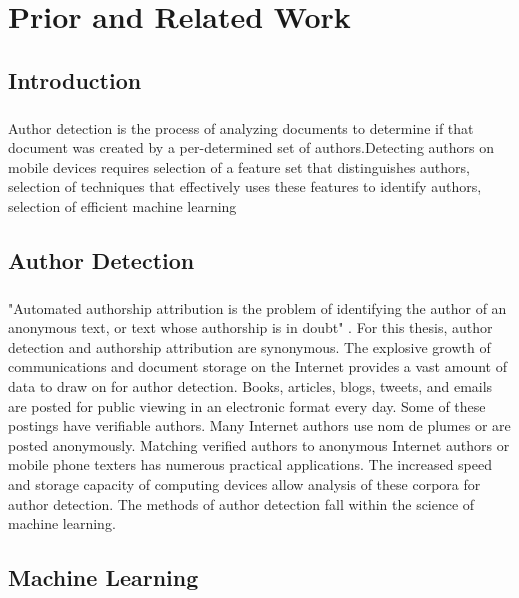 \chapter {Prior and Related Work}

\section {Introduction}
	\paragraph{}Author detection is the process of analyzing documents to determine if that document was created by a per-determined set of authors.Detecting authors on mobile devices requires selection of a feature set that distinguishes authors, selection of techniques that effectively uses these features to identify authors, selection of efficient machine learning

\section {Author Detection}
	\paragraph{}"Automated authorship attribution is the problem of identifying the author of an anonymous text, or text whose authorship is in doubt" \cite{love_attributing_2002}.  For this thesis, author detection and authorship attribution are synonymous.  The explosive growth of communications and document storage on the Internet provides a vast amount of data to draw on for author detection.  Books, articles, blogs, tweets, and emails are posted for public viewing in an electronic format every day.  Some of these postings have verifiable authors.  Many Internet authors use nom de plumes or are posted anonymously.  Matching verified authors to anonymous Internet authors or mobile phone texters has numerous practical applications. The increased speed and storage capacity of computing devices allow analysis of these corpora for author detection. The methods of author detection fall within the science of machine learning.

\section {Machine Learning}
